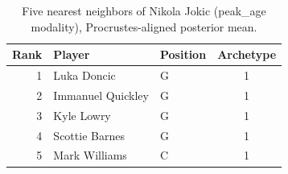 \begin{table}[htbp]
  \centering\small
  \begin{tabular}{rllc}
    \toprule
    Rank & Player & Position & Archetype \\
    \midrule
    1 & Luka Doncic & G & 1 \\
    2 & Immanuel Quickley & G & 1 \\
    3 & Kyle Lowry & G & 1 \\
    4 & Scottie Barnes & G & 1 \\
    5 & Mark Williams & C & 1 \\
    \bottomrule
  \end{tabular}
  \caption{Five nearest neighbors of Nikola Jokic (peak_age modality), Procrustes-aligned posterior mean.}
  \label{tab:Nikola_Jokic_neighbors_peak_age}
\end{table}

